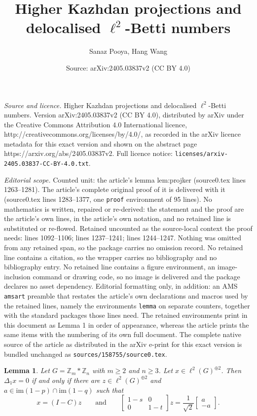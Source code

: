 \documentclass[10pt,a4paper]{amsart}
\title{Higher Kazhdan projections and delocalised $\ell^ 2$-Betti numbers}
\author{Sanaz Pooya, Hang Wang}
\date{Source: arXiv:2405.03837v2 (CC BY 4.0)}
\newtheorem{lemma}{Lemma}
\begin{document}
\maketitle

\noindent\emph{Source and licence.} Higher Kazhdan projections and delocalised $\ell^ 2$-Betti numbers. Version arXiv:2405.03837v2 (CC BY 4.0), distributed by arXiv under the Creative Commons Attribution 4.0 International licence, http://creativecommons.org/licenses/by/4.0/, as recorded in the arXiv licence metadata for this exact version and shown on the abstract page https://arxiv.org/abs/2405.03837v2. Full licence notice: \texttt{licenses/arxiv-2405.03837-CC-BY-4.0.txt}.\par\smallskip

\noindent\textit{Editorial scope.} Counted unit: the article's lemma lem:projker (source0.tex lines 1263--1281). The article's complete original proof of it is delivered with it (source0.tex lines 1283--1377, one \texttt{proof} environment of 95 lines). No mathematics is written, repaired or re-derived: the statement and the proof are the article's own lines, in the article's own notation, and no retained line is substituted or re-flowed.  Retained uncounted as the source-local context the proof needs: lines 1092--1106; lines 1237--1241; lines 1244--1247.  Nothing was omitted from any retained span, so the package carries no omission record.  No retained line contains a citation, so the wrapper carries no bibliography and no bibliography entry.  No retained line contains a figure environment, an image-inclusion command or drawing code, so no image is delivered and the package declares no asset dependency.  Editorial formatting only, in addition: an AMS \texttt{amsart} preamble that restates the article's own declarations and macros used by the retained lines, namely the environments \texttt{lemma} on separate counters, together with the standard packages those lines need.  The retained environments print in this document as Lemma 1 in order of appearance, whereas the article prints the same items with the numbering of its own full document.  The complete native source of the article as distributed in the arXiv e-print for this exact version is bundled unchanged as \texttt{sources/158755/source0.tex}.
	\begin{lemma}
		\label{lem:SolDelta1}
		Let $G= \mathbb Z_m \ast \mathbb Z_n$ with $m \geq 2$ and $n \geq 3$. 
		Let $x\in \ell^2 (G)^{\oplus 2}$. Then 
		$\Delta_1 x =0$ 
		if and only if there are 
		$z\in \ell^2 (G)^{\oplus 2}$ and 
		$a\in \mathrm{im}(1-p)\cap\mathrm{im}(1-q)$
		such that 
		\[
		  x=(I - C)z  \qquad \text{and} \qquad		
		  \begin{bmatrix}1-s & 0 \\ 0 & {1-t}\end{bmatrix}z= \frac{1}{\sqrt 2}\begin{bmatrix}a\\ -a\end{bmatrix}. 
		\] 
	\end{lemma}
\end{document}
